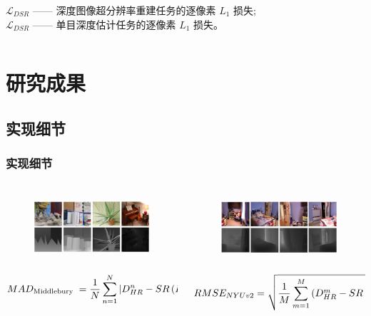 \documentclass[aspectratio=169,12pt]{beamer}
\begin{document}
\begin{frame}[t]
\begin{columns}
\begin{column}{0.65\textwidth}
{		$\mathcal{L}_{D S R}$ —— 深度图像超分辨率重建任务的逐像素 $L_1$ 损失;\\
		$\mathcal{L}_{D S R}$ —— 单目深度估计任务的逐像素 $L_1$ 损失。}

			
		\end{column}
	\end{columns}

\end{frame}

\section{研究成果}
\subsection{实现细节}
\begin{frame}[t]
	\frametitle{实现细节}
	\begin{columns}
		\begin{column}{0.45\textwidth}
			\begin{figure}
				\includegraphics[height=2.5cm]{20.png}
			\end{figure}
			\begin{equation}
				\scriptsize
				M A D_{\text {Middlebury }}=\frac{1}{N} \sum_{n=1}^{N}\left|D_{H R}^{n}-S R\left(D_{L R}^{n}\right)\right|
			\end{equation}		
		\end{column}
		\begin{column}{0.45\textwidth}
			\begin{figure}
				\includegraphics[height=2.5cm]{21.png}
			\end{figure}
			\begin{equation}
				\scriptsize
				R M S E_{N Y U v 2}=\sqrt{\frac{1}{M} \sum_{m=1}^{M}\left(D_{H R}^{m}-S R\left(D_{L R}^{m}\right)\right)^{2}}
			\end{equation}	
			

\end{column}
\end{columns}
\end{frame}
\end{document}

